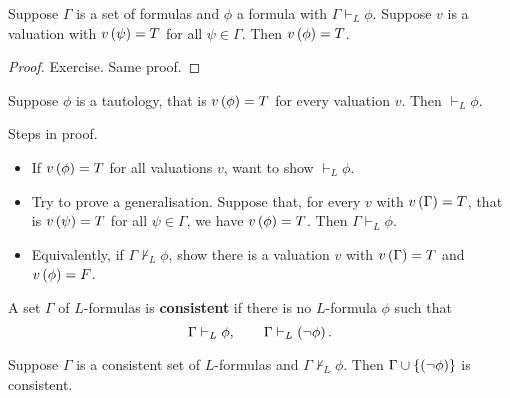 \begin{theorem}
Suppose $ \Gamma $ is a set of formulas and $ \phi $ a formula with $ \Gamma \vdash_L \phi $. Suppose $ v $ is a valuation with $ v\left( \psi \right) = T $ for all $ \psi \in \Gamma $. Then $ v\left( \phi \right) = T $.
\end{theorem}

\begin{proof}
Exercise. Same proof.
\end{proof}

\pagebreak

\begin{theorem}
\label{thm:1.3.4}
Suppose $ \phi $ is a tautology, that is $ v\left( \phi \right) = T $ for every valuation $ v $. Then $ \vdash_L \phi $.
\end{theorem}

\begin{remark1}
Steps in proof.
\begin{itemize}
\item If $ v\left( \phi \right) = T $ for all valuations $ v $, want to show $ \vdash_L \phi $.
\item Try to prove a generalisation. Suppose that, for every $ v $ with $ v\left( \Gamma \right) = T $, that is $ v\left( \psi \right) = T $ for all $ \psi \in \Gamma $, we have $ v\left( \phi \right) = T $. Then $ \Gamma \vdash_L \phi $.
\item Equivalently, if $ \Gamma \not\vdash_L \phi $, show there is a valuation $ v $ with $ v\left( \Gamma \right) = T $ and $ v\left( \phi \right) = F $.
\end{itemize}
\end{remark1}

\begin{definition}
A set $ \Gamma $ of $ L $-formulas is \textbf{consistent} if there is no $ L $-formula $ \phi $ such that
$$ \Gamma \vdash_L \phi, \qquad \Gamma \vdash_L \left( \neg \phi \right). $$
\end{definition}

\begin{proposition}
\label{prop:1.3.7}
Suppose $ \Gamma $ is a consistent set of $ L $-formulas and $ \Gamma \not\vdash_L \phi $. Then $ \Gamma \cup \left\{ \left( \neg \phi \right) \right\} $ is consistent.
\end{proposition}

